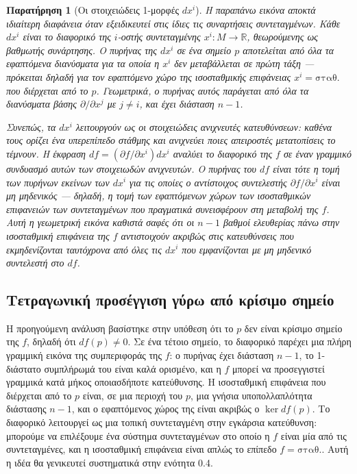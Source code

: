 \documentclass[11pt,a4paper,twoside,openright]{book}
\newtheorem{remark}[lemma]{Παρατήρηση}
\begin{document}
\begin{remark}[Οι στοιχειώδεις 1-μορφές $dx^i$]
Η παραπάνω εικόνα αποκτά ιδιαίτερη διαφάνεια όταν εξειδικευτεί στις ίδιες τις συναρτήσεις συντεταγμένων. Κάθε $dx^i$ είναι το διαφορικό της $i$-οστής συντεταγμένης $x^i: M \to \mathbb{R}$, θεωρούμενης ως βαθμωτής συνάρτησης. Ο πυρήνας της $dx^i$ σε ένα σημείο $p$ αποτελείται από όλα τα εφαπτόμενα διανύσματα για τα οποία η $x^i$ δεν μεταβάλλεται σε πρώτη τάξη --- πρόκειται δηλαδή για τον εφαπτόμενο χώρο της ισοσταθμικής επιφάνειας $x^i = \text{σταθ.}$ που διέρχεται από το $p$. Γεωμετρικά, ο πυρήνας αυτός παράγεται από όλα τα διανύσματα βάσης $\partial / \partial x^j$ με $j \neq i$, και έχει διάσταση $n-1$.

Συνεπώς, τα $dx^i$ λειτουργούν ως οι στοιχειώδεις ανιχνευτές κατευθύνσεων: καθένα τους ορίζει ένα υπερεπίπεδο στάθμης και ανιχνεύει ποιες απειροστές μετατοπίσεις το τέμνουν. Η έκφραση $df = (\partial f / \partial x^i) dx^i$ αναλύει το διαφορικό της $f$ σε έναν γραμμικό συνδυασμό αυτών των στοιχειωδών ανιχνευτών. Ο πυρήνας του $df$ είναι τότε η τομή των πυρήνων εκείνων των $dx^i$ για τις οποίες ο αντίστοιχος συντελεστής $\partial f / \partial x^i$ είναι μη μηδενικός --- δηλαδή, η τομή των εφαπτόμενων χώρων των ισοσταθμικών επιφανειών των συντεταγμένων που πραγματικά συνεισφέρουν στη μεταβολή της $f$. Αυτή η γεωμετρική εικόνα καθιστά σαφές ότι οι $n-1$ βαθμοί ελευθερίας πάνω στην ισοσταθμική επιφάνεια της $f$ αντιστοιχούν ακριβώς στις κατευθύνσεις που εκμηδενίζονται ταυτόχρονα από όλες τις $dx^i$ που εμφανίζονται με μη μηδενικό συντελεστή στο $df$.
\end{remark}

\subsection{Τετραγωνική προσέγγιση γύρω από κρίσιμο σημείο}

Η προηγούμενη ανάλυση βασίστηκε στην υπόθεση ότι το $p$ δεν είναι κρίσιμο σημείο της $f$, δηλαδή ότι $df(p) \neq 0$. Σε ένα τέτοιο σημείο, το διαφορικό παρέχει μια πλήρη γραμμική εικόνα της συμπεριφοράς της $f$: ο πυρήνας έχει διάσταση $n-1$, το 1-διάστατο συμπλήρωμά του είναι καλά ορισμένο, και η $f$ μπορεί να προσεγγιστεί γραμμικά κατά μήκος οποιασδήποτε κατεύθυνσης. Η ισοσταθμική επιφάνεια που διέρχεται από το $p$ είναι, σε μια περιοχή του $p$, μια γνήσια υποπολλαπλότητα διάστασης $n-1$, και ο εφαπτόμενος χώρος της είναι ακριβώς ο $\ker df(p)$. Το διαφορικό λειτουργεί ως μια τοπική συντεταγμένη στην εγκάρσια κατεύθυνση: μπορούμε να επιλέξουμε ένα σύστημα συντεταγμένων στο οποίο η $f$ είναι μία από τις συντεταγμένες, και η ισοσταθμική επιφάνεια είναι απλώς το επίπεδο $f = \text{σταθ.}$. Αυτή η ιδέα θα γενικευτεί συστηματικά στην ενότητα 0.4.
\end{document}
